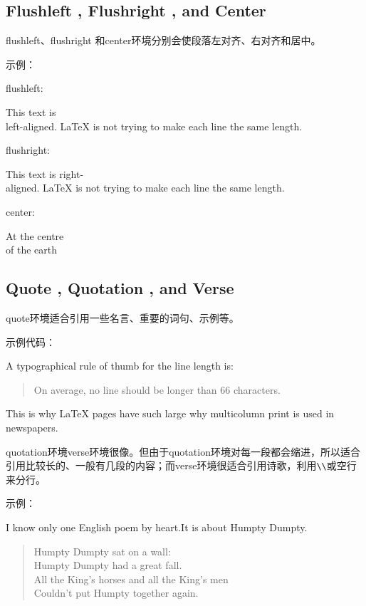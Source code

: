 \documentclass[UTF8]{ctexart}
\begin{document}
\subsection{Flushleft , Flushright , and Center}
flushleft、flushright 和center环境分别会使段落左对齐、右对齐和居中。

示例：

flushleft:

\begin{flushleft}
This text is\\left-aligned.
\LaTeX{} is not trying to make each line the same length.
\end{flushleft}

flushright:

\begin{flushright}
This text is right-\\aligned.
\LaTeX{} is not trying to make each line the same length.
\end{flushright}

center:

\begin{center}
At the centre\\of the earth
\end{center}

\subsection{Quote , Quotation , and Verse}
quote环境适合引用一些名言、重要的词句、示例等。

示例代码：

A typographical rule of thumb for the line length is:
\begin{quote}
On average, no line should be longer than 66 characters.
\end{quote}
This is why \LaTeX{} pages have such large why multicolumn print is used in newspapers.

quotation环境verse环境很像。但由于quotation环境对每一段都会缩进，所以适合引用比较长的、一般有几段的内容；而verse环境很适合引用诗歌，利用\texttt{\textbackslash}\texttt{\textbackslash}或空行来分行。

示例：

I know only one English poem by heart.It is about Humpty Dumpty.
\begin{flushleft}
\begin{verse}
Humpty Dumpty sat on a wall:\\
Humpty Dumpty had a great fall.\\
All the King's horses and all the King's men\\
Couldn't put Humpty together again.
\end{verse}
\end{flushleft}
\end{document}
